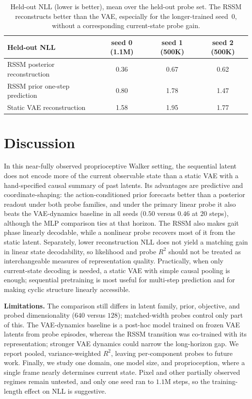 \documentclass{article} %
\newcommand{\rtwo}{\ensuremath{R^2}}
\begin{document}
\begin{table}[t]
\caption{Held-out NLL (lower is better), mean over the held-out probe set. The
RSSM reconstructs better than the VAE, especially for the longer-trained seed~0,
without a corresponding current-state probe gain.}
\label{tab:nll}
\begin{center}
\begin{tabular}{lccc}
\toprule
Held-out NLL & seed 0 (1.1M) & seed 1 (500K) & seed 2 (500K) \\
\midrule
RSSM posterior reconstruction & 0.36 & 0.67 & 0.62 \\
RSSM prior one-step prediction & 0.80 & 1.78 & 1.47 \\
Static VAE reconstruction      & 1.58 & 1.95 & 1.77 \\
\bottomrule
\end{tabular}
\end{center}
\end{table}

\section{Discussion}

In this near-fully observed proprioceptive Walker setting, the sequential latent
does not encode more of the current observable state than a static VAE with a
hand-specified causal summary of past latents. Its advantages are predictive and
coordinate-shaping: the action-conditioned prior forecasts better than a
posterior readout under both probe families, and under the primary linear probe
it also beats the VAE-dynamics baseline in all seeds ($0.50$ versus $0.46$ at
$20$ steps), although the MLP comparison ties at that horizon. The RSSM also
makes gait phase linearly decodable, while a nonlinear probe recovers most of it
from the static latent. Separately, lower reconstruction NLL does not yield a
matching gain in linear state decodability, so likelihood and probe \rtwo{}
should not be treated as interchangeable measures of representation quality.
Practically, when only current-state decoding is needed, a static VAE with simple
causal pooling is enough; sequential pretraining is most useful for multi-step
prediction and for making cyclic structure linearly accessible.

\textbf{Limitations.} The comparison still differs in latent family, prior,
objective, and probed dimensionality ($640$ versus $128$); matched-width probes
control only part of this. The VAE-dynamics baseline is a post-hoc model trained
on frozen VAE latents from probe episodes, whereas the RSSM transition was
co-trained with its representation; stronger VAE dynamics could narrow the
long-horizon gap. We report pooled, variance-weighted $R^2$, leaving
per-component probes to future work. Finally, we study one domain, one model
size, and proprioception, where a single frame nearly determines current state.
Pixel and other partially observed regimes remain untested, and only one seed
ran to $1.1$M steps, so the training-length effect on NLL is suggestive.
\end{document}
